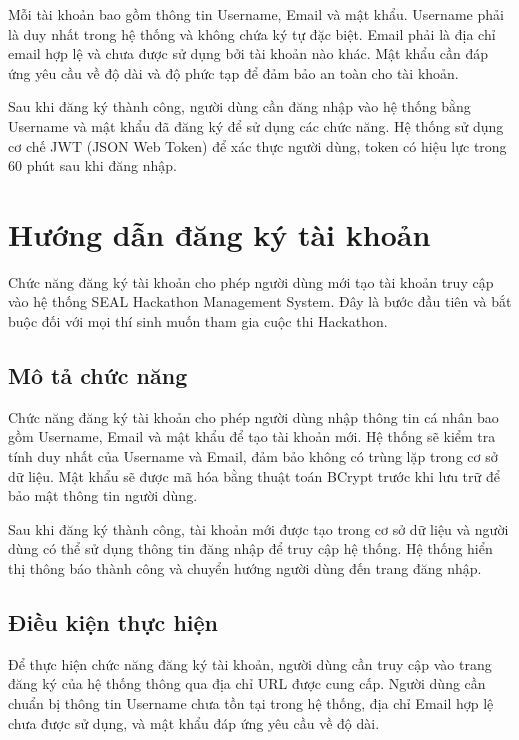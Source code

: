 Mỗi tài khoản bao gồm thông tin Username, Email và mật khẩu. Username phải là duy nhất trong hệ thống và không chứa ký tự đặc biệt. Email phải là địa chỉ email hợp lệ và chưa được sử dụng bởi tài khoản nào khác. Mật khẩu cần đáp ứng yêu cầu về độ dài và độ phức tạp để đảm bảo an toàn cho tài khoản.

Sau khi đăng ký thành công, người dùng cần đăng nhập vào hệ thống bằng Username và mật khẩu đã đăng ký để sử dụng các chức năng. Hệ thống sử dụng cơ chế JWT (JSON Web Token) để xác thực người dùng, token có hiệu lực trong 60 phút sau khi đăng nhập.


\section{Hướng dẫn đăng ký tài khoản}

Chức năng đăng ký tài khoản cho phép người dùng mới tạo tài khoản truy cập vào hệ thống SEAL Hackathon Management System. Đây là bước đầu tiên và bắt buộc đối với mọi thí sinh muốn tham gia cuộc thi Hackathon.

\subsection{Mô tả chức năng}

Chức năng đăng ký tài khoản cho phép người dùng nhập thông tin cá nhân bao gồm Username, Email và mật khẩu để tạo tài khoản mới. Hệ thống sẽ kiểm tra tính duy nhất của Username và Email, đảm bảo không có trùng lặp trong cơ sở dữ liệu. Mật khẩu sẽ được mã hóa bằng thuật toán BCrypt trước khi lưu trữ để bảo mật thông tin người dùng.

Sau khi đăng ký thành công, tài khoản mới được tạo trong cơ sở dữ liệu và người dùng có thể sử dụng thông tin đăng nhập để truy cập hệ thống. Hệ thống hiển thị thông báo thành công và chuyển hướng người dùng đến trang đăng nhập.

\subsection{Điều kiện thực hiện}

Để thực hiện chức năng đăng ký tài khoản, người dùng cần truy cập vào trang đăng ký của hệ thống thông qua địa chỉ URL được cung cấp. Người dùng cần chuẩn bị thông tin Username chưa tồn tại trong hệ thống, địa chỉ Email hợp lệ chưa được sử dụng, và mật khẩu đáp ứng yêu cầu về độ dài.

